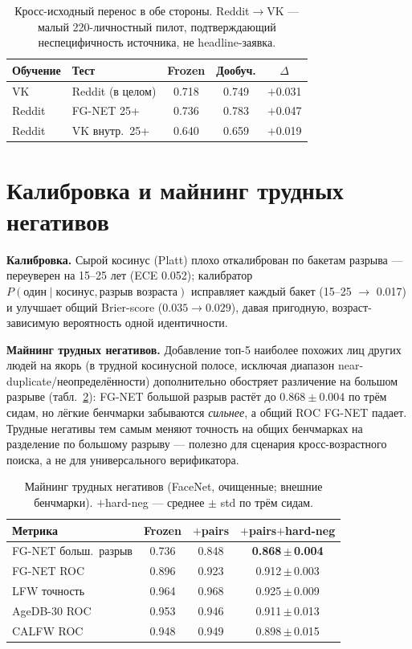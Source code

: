 \documentclass[10pt,twocolumn,letterpaper]{article}
\begin{document}
\begin{table}[t]
\centering
\small
\setlength{\tabcolsep}{4pt}
\begin{tabular}{@{}llccc@{}}
\toprule
Обучение & Тест & Frozen & Дообуч. & $\Delta$ \\
\midrule
VK & Reddit (в целом) & 0.718 & 0.749 & $+$0.031 \\
Reddit & FG-NET 25+ & 0.736 & 0.783 & $+$0.047 \\
Reddit & VK внутр.\ 25+ & 0.640 & 0.659 & $+$0.019 \\
\bottomrule
\end{tabular}
\caption{Кросс-исходный перенос в обе стороны. Reddit$\to$VK — малый 220-личностный пилот, подтверждающий
неспецифичность источника, не headline-заявка.}
\label{tab:crosssource}
\end{table}

\section{Калибровка и майнинг трудных негативов}\label{sup:calib}
\textbf{Калибровка.} Сырой косинус (Platt) плохо откалиброван по бакетам разрыва — переуверен на 15--25
лет (ECE 0.052); калибратор $P(\text{один}\mid\text{косинус},\text{разрыв возраста})$ исправляет каждый
бакет (15--25 $\rightarrow$ 0.017) и улучшает общий Brier-score ($0.035\!\rightarrow\!0.029$), давая
пригодную, возраст-зависимую вероятность одной идентичности.

\textbf{Майнинг трудных негативов.} Добавление топ-5 наиболее похожих лиц других людей на якорь (в
трудной косинусной полосе, исключая диапазон near-duplicate/неопределённости) дополнительно обостряет
различение на большом разрыве (табл.~\ref{tab:hardneg}): FG-NET большой разрыв растёт до $0.868\pm0.004$
по трём сидам, но лёгкие бенчмарки забываются \emph{сильнее}, а общий ROC FG-NET падает. Трудные негативы
тем самым меняют точность на общих бенчмарках на разделение по большому разрыву — полезно для сценария
кросс-возрастного поиска, а не для универсального верификатора.

\begin{table}[t]
\centering
\small
\begin{tabular}{@{}lccc@{}}
\toprule
Метрика & Frozen & $+$pairs & $+$pairs$+$hard-neg \\
\midrule
FG-NET больш.\ разрыв & 0.736 & 0.848 & \textbf{0.868\,$\pm$\,0.004} \\
FG-NET ROC & 0.896 & 0.923 & 0.912\,$\pm$\,0.003 \\
LFW точность & 0.964 & 0.968 & 0.925\,$\pm$\,0.009 \\
AgeDB-30 ROC & 0.953 & 0.946 & 0.911\,$\pm$\,0.013 \\
CALFW ROC & 0.948 & 0.949 & 0.898\,$\pm$\,0.015 \\
\bottomrule
\end{tabular}
\caption{Майнинг трудных негативов (FaceNet, очищенные; внешние бенчмарки). $+$hard-neg — среднее $\pm$
std по трём сидам.}
\label{tab:hardneg}
\end{table}
\end{document}
